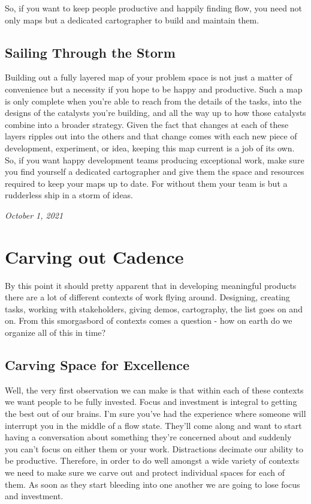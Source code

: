 \documentclass[10pt,a5paper]{book}
\begin{document}
So, if you want to keep people productive and happily finding flow, you need not only maps but a dedicated cartographer to build and maintain them.

\subsection{Sailing Through the Storm}
Building out a fully layered map of your problem space is not just a matter of convenience but a necessity if you hope to be happy and productive. Such a map is only complete when you're able to reach from the details of the tasks, into the designs of the catalysts you're building, and all the way up to how those catalysts combine into a broader strategy. Given the fact that changes at each of these layers ripples out into the others and that change comes with each new piece of development, experiment, or idea, keeping this map current is a job of its own. So, if you want happy development teams producing exceptional work, make sure you find yourself a dedicated cartographer and give them the space and resources required to keep your maps up to date. For without them your team is but a rudderless ship in a storm of ideas. 


\textit{October 1, 2021}

\section{Carving out Cadence}
By this point it should pretty apparent that in developing meaningful products there are a lot of different contexts of work flying around. Designing, creating tasks, working with stakeholders, giving demos, cartography, the list goes on and on. From this smorgasbord of contexts comes a question - how on earth do we organize all of this in time?  

\subsection{Carving Space for Excellence}
Well, the very first observation we can make is that within each of these contexts we want people to be fully invested. Focus and investment is integral to getting the best out of our brains. I'm sure you've had the experience where someone will interrupt you in the middle of a flow state. They'll come along and want to start having a conversation about something they're concerned about and suddenly you can't focus on either them or your work. Distractions decimate our ability to be productive. Therefore, in order to do well amongst a wide variety of contexts we need to make sure we carve out and protect individual spaces for each of them. As soon as they start bleeding into one another we are going to lose focus and investment. 
\end{document}
